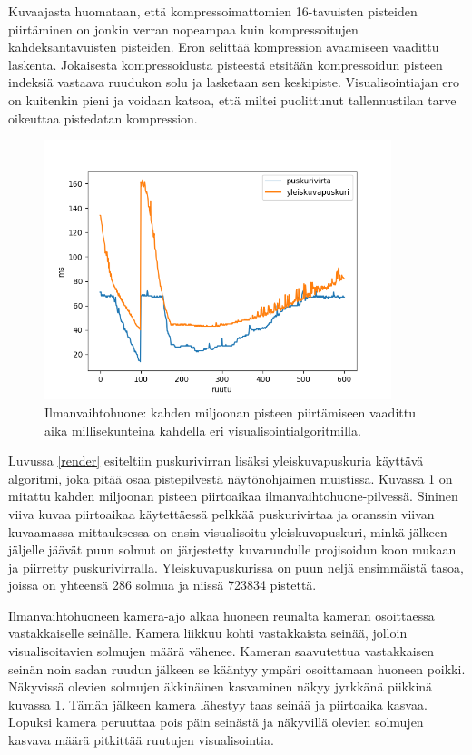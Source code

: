 Kuvaajasta huomataan, että kompressoimattomien 16-tavuisten pisteiden piirtäminen on jonkin verran nopeampaa kuin kompressoitujen kahdeksantavuisten pisteiden. Eron selittää kompression avaamiseen vaadittu laskenta. Jokaisesta kompressoidusta pisteestä etsitään kompressoidun pisteen indeksiä vastaava ruudukon solu ja lasketaan sen keskipiste. Visualisointiajan ero on kuitenkin pieni ja voidaan katsoa, että miltei puolittunut tallennustilan tarve oikeuttaa pistedatan kompression.

\begin{figure}[h] 
    \centering
    \includegraphics[width=0.9\textwidth]{tuloksia/ilmanvaihtohuone_ms_per_frame.png}
    \caption{Ilmanvaihtohuone: kahden miljoonan pisteen piirtämiseen vaadittu aika millisekunteina kahdella eri visualisointialgoritmilla.}
    \label{iv_ms}
\end{figure}

Luvussa \ref{render} esiteltiin puskurivirran lisäksi yleiskuvapuskuria käyttävä algoritmi, joka pitää osaa pistepilvestä näytönohjaimen muistissa. Kuvassa \ref{iv_ms} on mitattu kahden miljoonan pisteen piirtoaikaa ilmanvaihtohuone-pilvessä. Sininen viiva kuvaa piirtoaikaa käytettäessä pelkkää puskurivirtaa ja oranssin viivan kuvaamassa mittauksessa on ensin visualisoitu yleiskuvapuskuri, minkä jälkeen jäljelle jäävät puun solmut on järjestetty kuvaruudulle projisoidun koon mukaan ja piirretty puskurivirralla. Yleiskuvapuskurissa on puun neljä ensimmäistä tasoa, joissa on yhteensä 286 solmua ja niissä 723834 pistettä.

Ilmanvaihtohuoneen kamera-ajo alkaa huoneen reunalta kameran osoittaessa vastakkaiselle seinälle. Kamera liikkuu kohti vastakkaista seinää, jolloin visualisoitavien solmujen määrä vähenee. Kameran saavutettua vastakkaisen seinän noin sadan ruudun jälkeen se kääntyy ympäri osoittamaan huoneen poikki. Näkyvissä olevien solmujen äkkinäinen kasvaminen näkyy jyrkkänä piikkinä kuvassa \ref{iv_ms}. Tämän jälkeen kamera lähestyy taas seinää ja piirtoaika kasvaa. Lopuksi kamera peruuttaa pois päin seinästä ja näkyvillä olevien solmujen kasvava määrä pitkittää ruutujen visualisointia.

